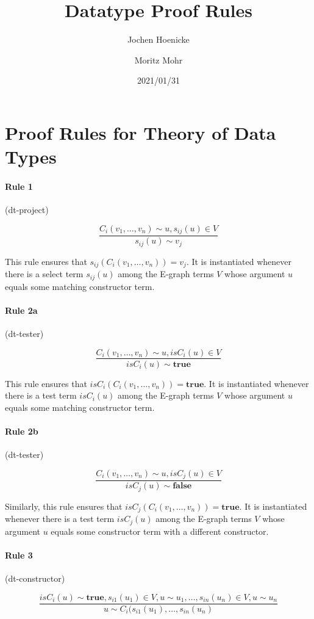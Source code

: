 \documentclass[a4paper]{article}
\title{Datatype Proof Rules}
\author{Jochen Hoenicke \and Moritz Mohr}
\date{2021/01/31}
\newcommand\true{\mathbf{true}}
\newcommand\false{\mathbf{false}}
\newcommand\isC{\mathit{isC}}
\begin{document}
\maketitle
\section{Proof Rules for Theory of Data Types}

\paragraph{Rule 1} (dt-project)

\[
\frac{C_i(v_1,\dots,v_n) \sim u, s_{ij}(u) \in V}{s_{ij}(u) \sim v_j}
\]

This rule ensures that $s_{ij}(C_i(v_1,\dots,v_n)) = v_j$.  It is
instantiated whenever there is a select term $s_{ij}(u)$ among the
E-graph terms $V$ whose argument $u$ equals some matching constructor
term.


\paragraph{Rule 2a} (dt-tester)

\[
\frac{C_i(v_1,\dots,v_n) \sim u, \isC_i(u)\in V}{\isC_i(u) \sim \true}
\]

This rule ensures that $\isC_i(C_i(v_1,\dots,v_n)) = \true$.  It is
instantiated whenever there is a test term $\isC_i(u)$ among the
E-graph terms $V$ whose argument $u$ equals some matching constructor
term.


\paragraph{Rule 2b} (dt-tester)

\[
\frac{C_i(v_1,\dots,v_n) \sim u, \isC_j(u)\in V}{\isC_j(u) \sim \false}
\]

Similarly, this rule ensures that $\isC_j(C_i(v_1,\dots,v_n)) = \true$.  It is
instantiated whenever there is a test term $\isC_j(u)$ among the
E-graph terms $V$ whose argument $u$ equals some constructor
term with a different constructor.


\paragraph{Rule 3} (dt-constructor)

\[
\frac{\isC_i(u) \sim \true, s_{i1}(u_1) \in V,u \sim u_1,\dots,s_{in}(u_n)\in V,u \sim u_n}{u \sim C_i(s_{i1}(u_1),\dots, s_{in}(u_n)}
\]
\end{document}

